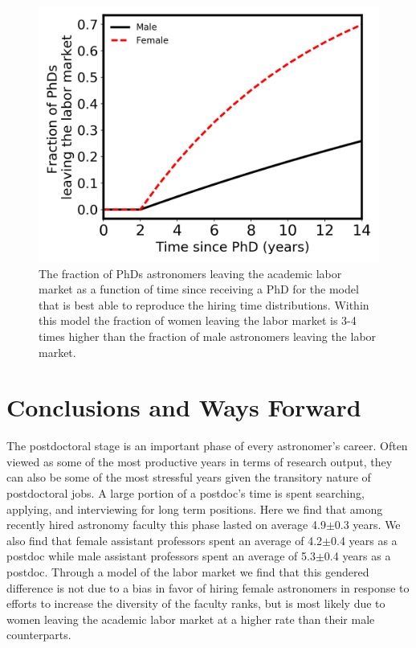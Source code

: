 \documentclass[modern]{aastex62}
\begin{document}
\begin{figure}[!hbt]
\center
\includegraphics[scale=.6]{df_model3.png}
\caption{The fraction of PhDs astronomers leaving the academic labor market as a function of time since receiving a PhD for the model that is best able to reproduce the hiring time distributions. Within this model the fraction of women leaving the labor market is 3-4 times higher than the fraction of male astronomers leaving the labor market. \label{df_model3}}
\end{figure}


\section{Conclusions and Ways Forward}
The postdoctoral stage is an important phase of every astronomer's career. Often viewed as some of the most productive years in terms of research output, they can also be some of the most stressful years given the transitory nature of postdoctoral jobs. A large portion of a postdoc's time is spent searching, applying, and interviewing for long term positions. Here we find that among recently hired astronomy faculty this phase lasted on average 4.9$\pm$0.3 years. We also find that female assistant professors spent an average of 4.2$\pm$0.4 years as a postdoc while male assistant professors spent an average of 5.3$\pm$0.4 years as a postdoc. Through a model of the labor market we find that this gendered difference is not due to a bias in favor of hiring female astronomers in response to efforts to increase the diversity of the faculty ranks, but is most likely due to women leaving the academic labor market at a higher rate than their male counterparts. 
\end{document}
